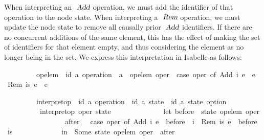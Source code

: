 When interpreting an $\isa{Add}$ operation, we must add the identifier of that operation to the node state.
When interpreting a $\isa{Rem}$ operation, we must update the node state to remove all causally prior $\isa{Add}$ identifiers.
If there are no concurrent additions of the same element, this has the effect of making the set of identifiers for that element empty, and thus considering the element as no longer being in the set.
We express this interpretation in Isabelle as follows:
\vspace{0.275em}
\begin{isabellebody}
\ \ \ \ \ \ \ \ \ op{\isacharunderscore}elem\ {\isacharcolon}{\isacharcolon}\ {\isachardoublequoteopen}{\isacharparenleft}{\isacharprime}id{\isacharcomma}\ {\isacharprime}a{\isacharparenright}\ operation\ {\isasymRightarrow}\ {\isacharprime}a{\isachardoublequoteclose}\ \ {\isachardoublequoteopen}op{\isacharunderscore}elem\ oper\ {\isasymequiv}\ case\ oper\ of\ Add\ i\ e\ {\isasymRightarrow}\ e\ {\isacharbar}\ Rem\ is\ e\ {\isasymRightarrow}\ e{\isachardoublequoteclose}
\end{isabellebody}
\vspace{0.275em}
\begin{isabellebody}
\ \ \ \ \ \ \ \ \ interpret{\isacharunderscore}op\ {\isacharcolon}{\isacharcolon}\ {\isachardoublequoteopen}{\isacharparenleft}{\isacharprime}id{\isacharcomma}\ {\isacharprime}a{\isacharparenright}\ operation\ {\isasymRightarrow}\ {\isacharparenleft}{\isacharprime}id{\isacharcomma}\ {\isacharprime}a{\isacharparenright}\ state\ {\isasymRightarrow}\ {\isacharparenleft}{\isacharprime}id{\isacharcomma}\ {\isacharprime}a{\isacharparenright}\ state\ option{\isachardoublequoteclose}\ \isanewline
\ \ \ \ \ \ \ \ \ \ {\isachardoublequoteopen}interpret{\isacharunderscore}op\ oper\ state\ {\isasymequiv}\isanewline
\ \ \ \ \ \ \ \ \ \ \ \ \ let\ before\ {\isacharequal}\ state\ {\isacharparenleft}op{\isacharunderscore}elem\ oper{\isacharparenright}{\isacharsemicolon}\isanewline
\ \ \ \ \ \ \ \ \ \ \ \ \ \ \ \ \ after\ \ {\isacharequal}\ case\ oper\ of\ Add\ i\ e\ {\isasymRightarrow}\ before\ {\isasymunion}\ {\isacharbraceleft}i{\isacharbraceright}\ {\isacharbar}\ Rem\ is\ e\ {\isasymRightarrow}\ before\ {\isacharminus}\ is\isanewline
\ \ \ \ \ \ \ \ \ \ \ \ \ in\ \ Some\ {\isacharparenleft}state\ {\isacharparenleft}{\isacharparenleft}op{\isacharunderscore}elem\ oper{\isacharparenright}\ {\isacharcolon}{\isacharequal}\ after{\isacharparenright}{\isacharparenright}{\isachardoublequoteclose}
\end{isabellebody}
\vspace{0.275em}

